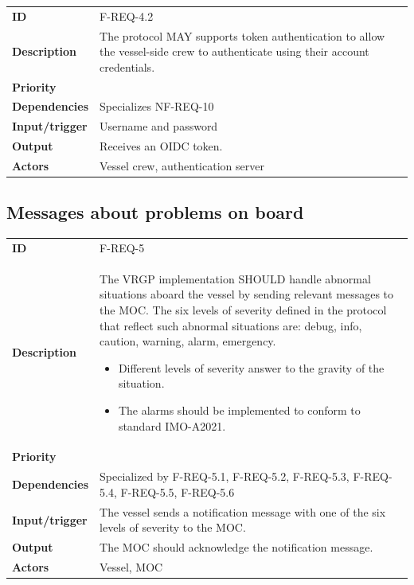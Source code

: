 \begin{table}[H]
	\centering
	\begin{tabularx}{\textwidth}{ l X }
		\rowcolor[HTML]{E7E7E7}
		\textbf{ID} & F-REQ-4.2 \\
		\textbf{Description} & The protocol MAY supports token authentication to allow the vessel-side crew to authenticate using their account credentials. \\
		\rowcolor[HTML]{E7E7E7}
		\textbf{Priority} & \prioopt\\
		\textbf{Dependencies} & Specializes NF-REQ-10 \\
		\rowcolor[HTML]{E7E7E7}
		\textbf{Input/trigger} & Username and password \\
		\textbf{Output} & Receives an OIDC token. \\
		\rowcolor[HTML]{E7E7E7}
		\textbf{Actors} & Vessel crew, authentication server \\
	\end{tabularx}
	\label{table:f-req-4.2}
\end{table}

\subsection{Messages about problems on board}

\begin{table}[H]
	\centering
	\begin{tabularx}{\textwidth}{ l X }
		\rowcolor[HTML]{E7E7E7}
		\textbf{ID} & F-REQ-5 \\
		\textbf{Description} & The VRGP implementation SHOULD handle abnormal situations aboard the vessel by sending relevant messages to the MOC. The six levels of severity defined in the protocol that reflect such abnormal situations are: debug, info, caution, warning, alarm, emergency.
			\begin{itemize}
				\item Different levels of severity answer to the gravity of the situation.
				\item The alarms should be implemented to conform to standard IMO-A2021.
			\end{itemize} \\
		\rowcolor[HTML]{E7E7E7}
		\textbf{Priority} & \priohigh \\
		\textbf{Dependencies} & Specialized by F-REQ-5.1, F-REQ-5.2, F-REQ-5.3, F-REQ-5.4, F-REQ-5.5, F-REQ-5.6 \\
		\rowcolor[HTML]{E7E7E7}
		\textbf{Input/trigger} & The vessel sends a notification message with one of the six levels of severity to the MOC. \\
		\textbf{Output} & The MOC should acknowledge the notification message. \\
		\rowcolor[HTML]{E7E7E7}
		\textbf{Actors} & Vessel, MOC \\
	\end{tabularx}
	\label{table:f-req-5}
\end{table}

